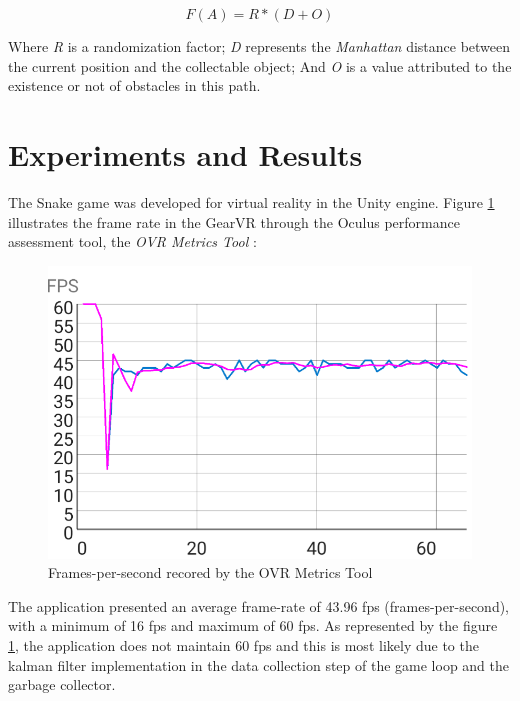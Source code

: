 \documentclass[runningheads]{llncs}
\begin{document}
\begin{equation}
F(A) = R * (D + O)
\label{equation11}
\end{equation}

Where \textit{R} is a randomization factor; \textit{D} represents the \textit{Manhattan} distance between the current position and the collectable object; And \textit{O} is a value attributed to the existence or not of obstacles in this path.

\section{Experiments and Results} \label{sec:results}
The Snake game was developed for virtual reality in the Unity engine. Figure \ref{fig:VRPerformanceChart}  illustrates the frame rate in the GearVR through the Oculus performance assessment tool, the \textit{OVR Metrics Tool} \cite{ovrmetrictool}:

\begin{figure}[h]
\centering
\includegraphics[width=\textwidth]{src/hci2020-images/VRPerformance.png}
\caption{Frames-per-second recored by the OVR Metrics Tool}
\label{fig:VRPerformanceChart}
\end{figure}

The application presented an average frame-rate of 43.96 fps (frames-per-second), with a minimum of 16 fps and maximum of 60 fps. As represented by the figure \ref{fig:VRPerformanceChart}, the application does not maintain 60 fps and this is most likely due to the kalman filter implementation in the data collection step of the game loop and the garbage collector.

\end{document}
